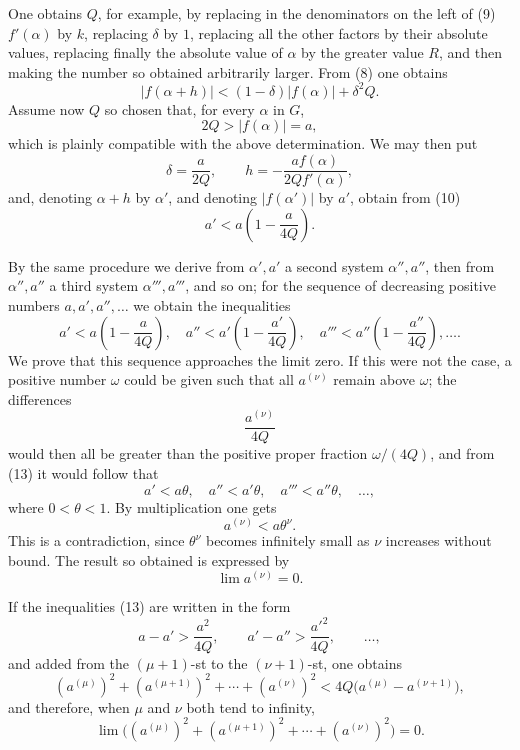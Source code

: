 \documentclass[11pt]{article}
\begin{document}
One obtains $Q$, for example, by replacing in the denominators on the left of (9) $f'(\alpha)$ by $k$, replacing $\delta$ by $1$, replacing all the other factors by their absolute values, replacing finally the absolute value of $\alpha$ by the greater value $R$, and then making the number so obtained arbitrarily larger. From (8) one obtains
\begin{equation}
 |f(\alpha+h)|<(1-\delta)|f(\alpha)|+\delta^2Q.
\tag{10}
\end{equation}
Assume now $Q$ so chosen that, for every $\alpha$ in $G$,
\[
 2Q>|f(\alpha)|=a,
\]
which is plainly compatible with the above determination. We may then put
\begin{equation}
 \delta=\frac{a}{2Q},\qquad
 h=-\frac{a f(\alpha)}{2Q f'(\alpha)},
\tag{11}
\end{equation}
and, denoting $\alpha+h$ by $\alpha'$, and denoting $|f(\alpha')|$ by $a'$, obtain from (10)
\begin{equation}
 a'<a\left(1-\frac{a}{4Q}\right).
\tag{12}
\end{equation}

By the same procedure we derive from $\alpha',a'$ a second system $\alpha'',a''$, then from $\alpha'',a''$ a third system $\alpha''',a'''$, and so on; for the sequence of decreasing positive numbers $a,a',a'',\ldots$ we obtain the inequalities
\begin{equation}
 a'<a\left(1-\frac{a}{4Q}\right),\quad
 a''<a'\left(1-\frac{a'}{4Q}\right),\quad
 a'''<a''\left(1-\frac{a''}{4Q}\right),\ldots .
\tag{13}
\end{equation}
We prove that this sequence approaches the limit zero. If this were not the case, a positive number $\omega$ could be given such that all $a^{(\nu)}$ remain above $\omega$; the differences
\[
 \frac{a^{(\nu)}}{4Q}
\]
would then all be greater than the positive proper fraction $\omega/(4Q)$, and from (13) it would follow that
\[
 a'<a\theta,
 \quad a''<a'\theta,
 \quad a'''<a''\theta,
 \quad\ldots,
\]
where $0<\theta<1$. By multiplication one gets
\begin{equation}
 a^{(\nu)}<a\theta^\nu.
\tag{14}
\end{equation}
This is a contradiction, since $\theta^\nu$ becomes infinitely small as $\nu$ increases without bound. The result so obtained is expressed by
\begin{equation}
 \lim a^{(\nu)}=0.
\tag{15}
\end{equation}

If the inequalities (13) are written in the form
\[
 a-a'>\frac{a^2}{4Q},\qquad
 a'-a''>\frac{a'^2}{4Q},\qquad\ldots,
\]
and added from the $(\mu+1)$-st to the $(\nu+1)$-st, one obtains
\[
 (a^{(\mu)})^2+(a^{(\mu+1)})^2+\cdots+(a^{(\nu)})^2
 <4Q\bigl(a^{(\mu)}-a^{(\nu+1)}\bigr),
\]
and therefore, when $\mu$ and $\nu$ both tend to infinity,
\begin{equation}
 \lim\bigl((a^{(\mu)})^2+(a^{(\mu+1)})^2+\cdots+(a^{(\nu)})^2\bigr)=0.
\tag{16}
\end{equation}
\end{document}
